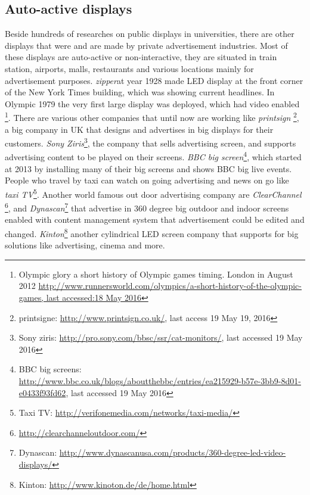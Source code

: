 \subsection{Auto-active displays}
Beside hundreds of researches on public displays in universities, there are other displays that were and are made by private advertisement industries. Most of these displays are auto-active or non-interactive, they are situated in train station, airports, malls, restaurants and various locations mainly for advertisement purposes. \emph{zipper}\cite{zipper}at year 1928 made LED display at the front corner of the New York Times building, which was showing current headlines. In Olympic 1979 the very first large display was deployed, which had video enabled \footnote{Olympic glory a short history of Olympic games timing. London in August 2012 \url{http://www.runnersworld.com/olympics/a-short-history-of-the-olympic-games, last accessed:18 May 2016}}. There are various other companies that until now are working like \emph{printsign} \footnote{printsigne: \url{http://www.printsign.co.uk/}, last access 19 May 19, 2016}, a big company in UK that designs and advertises in big displays for their customers. \emph{Sony Ziris}\footnote{Sony ziris: \url{http://pro.sony.com/bbsc/ssr/cat-monitors/}, last accessed 19 May 2016}, the company that sells advertising screen, and supports advertising content to be played on their screens. \emph{BBC big screen}\footnote{BBC big screens: \url{http://www.bbc.co.uk/blogs/aboutthebbc/entries/ea215929-b57e-3bb9-8d01-e0433f93fd62}, last accessed 19 May 2016}, which started at 2013 by installing many of their big screens and shows BBC big live events. People who travel by taxi can watch on going advertising and news on go like \emph{taxi TV}\footnote{Taxi TV: \url{http://verifonemedia.com/networks/taxi-media/}}. Another world famous out door advertising company are \emph{ClearChannel} \footnote{\url{http://clearchanneloutdoor.com/}}, and  \emph{Dynascan}\footnote{ Dynascan: \url{http://www.dynascanusa.com/products/360-degree-led-video-displays/}}  that advertise in 360 degree big outdoor and indoor screens enabled with content management system that advertisement could be edited and changed.  \emph{Kinton}\footnote{Kinton: \url{http://www.kinoton.de/de/home.html}} another cylindrical LED screen company that supports for big solutions like advertising, cinema and more.


